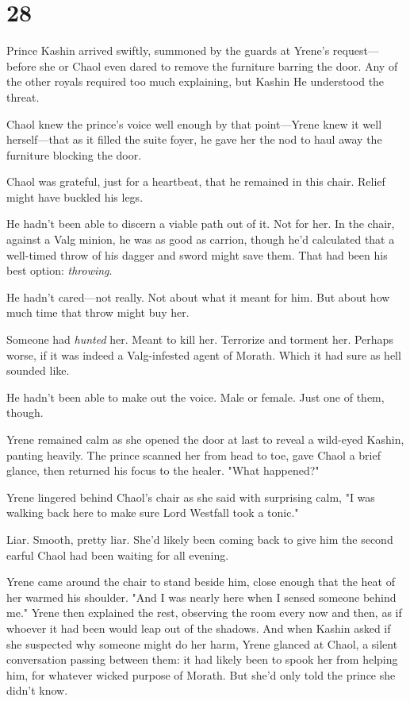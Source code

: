 
\chapter{28}

Prince Kashin arrived swiftly, summoned by the guards at Yrene's request--- before she or Chaol even dared to remove the furniture barring the door. Any of the other royals required too much explaining, but Kashin  He understood the threat.

Chaol knew the prince's voice well enough by that point---Yrene knew it well herself---that as it filled the suite foyer, he gave her the nod to haul away the furniture blocking the door.

Chaol was grateful, just for a heartbeat, that he remained in this chair. Relief might have buckled his legs.

He hadn't been able to discern a viable path out of it. Not for her. In the chair, against a Valg minion, he was as good as carrion, though he'd calculated that a well-timed throw of his dagger and sword might save them. That had been his best option: \emph{throwing}.

He hadn't cared---not really. Not about what it meant for him. But about how much time that throw might buy her.

Someone had \emph{hunted} her. Meant to kill her. Terrorize and torment her. Perhaps worse, if it was indeed a Valg-infested agent of Morath. Which it had sure as hell sounded like.

He hadn't been able to make out the voice. Male or female. Just one of them, though.

Yrene remained calm as she opened the door at last to reveal a wild-eyed Kashin, panting heavily. The prince scanned her from head to toe, gave Chaol a brief glance, then returned his focus to the healer. "What happened?"

Yrene lingered behind Chaol's chair as she said with surprising calm, "I was walking back here to make sure Lord Westfall took a tonic."

Liar. Smooth, pretty liar. She'd likely been coming back to give him the second earful Chaol had been waiting for all evening.

Yrene came around the chair to stand beside him, close enough that the heat of her warmed his shoulder. "And I was nearly here when I sensed someone behind me." Yrene then explained the rest, observing the room every now and then, as if whoever it had been would leap out of the shadows. And when Kashin asked if she suspected why someone might do her harm, Yrene glanced at Chaol, a silent conversation passing between them: it had likely been to spook her from helping him, for whatever wicked purpose of Morath. But she'd only told the prince she didn't know.

